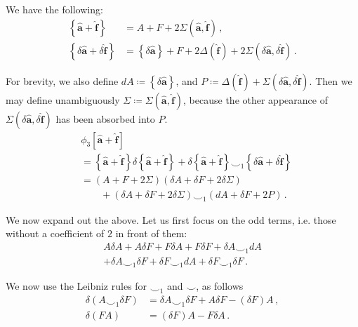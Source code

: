 \documentclass[aps,twocolumn,prx,floatfix,preprintnumbers, nofootinbib,10pt]{revtex4-2}
\numberwithin{equation}{section}
\theoremstyle{definition}
\theoremstyle{remark}
\theoremstyle{claim}
\newcommand{\lbbb}{\left\{}
\newcommand{\rbbb}{\right\}}
\newcommand{\lrb}[1]{\lbbb #1 \rbbb}
\begin{document}
We have the following:
\begin{align}
 \lrb{\bm{\hat{a}} + \bm{\hat{f}}} &= A + F + 2 \Sigma(\bm{\hat{a}}, \bm{\hat{f}}) \,, \\
 \lrb{\delta \bm{\hat{a}} + \delta \bm{\hat{f}}} &= \lrb{\delta \bm{\hat{a}}} + F + 2\Delta(\bm{\hat{f}}) + 2 \Sigma(\delta \bm{\hat{a}}, \delta \bm{\hat{f}}) \,.
\end{align}

For brevity, we also define $d A \coloneqq \lrb{\delta \bm{\hat{a}}}$, and $P \coloneqq \Delta(\bm{\hat{f}}) + \Sigma(\delta \bm{\hat{a}}, \delta \bm{\hat{f}})$. Then we may define unambiguously $\Sigma \coloneqq \Sigma(\bm{\hat{a}}, \bm{\hat{f}})$, because the other appearance of $\Sigma(\delta \bm{\hat{a}}, \delta \bm{\hat{f}})$ has been absorbed into $P$.
\begin{align}
&\phi_3[\bm{\hat{a}} + \bm{\hat{f}}]  \nonumber \\
&= \lbbb \bm{\hat{a}} + \bm{\hat{f}}\rbbb \delta \lbbb \bm{\hat{a}} +\bm{\hat{f}} \rbbb + \delta \lbbb \bm{\hat{a}}+\bm{\hat{f}} \rbbb \smile_1 \lbbb \delta \bm{\hat{a}} + \delta \bm{\hat{f}} \rbbb \nonumber \\
&= (A + F + 2 \Sigma)(\delta A + \delta F + 2 \delta \Sigma) \nonumber \\
&\hspace{2em}+ (\delta A + \delta F + 2 \delta \Sigma) \smile_1 (dA + \delta F + 2P) \,. %
\end{align}

We now expand out the above. Let us first focus on the odd terms, i.e. those without a coefficient of $2$ in front of them:
\begin{multline}
A \delta A + A \delta F + F \delta A + F \delta F + \delta A \smile_1 dA \\
+ \delta A \smile_1 \delta F + \delta F \smile_1 dA + \delta F \smile_1 \delta F \,.
\end{multline}

We now use the Leibniz rules for $\smile_1$ and $\smile$, as follows
\begin{align}
\delta (A \smile_1 \delta F) &= \delta A \smile_1 \delta F + A \delta F - (\delta F) A \,, \\
\delta (F A) &= (\delta F) A - F \delta A \,.
\end{align}
\end{document}

